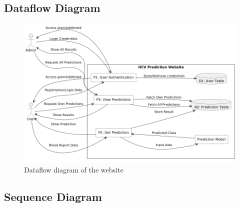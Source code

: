 \subsection{Dataflow Diagram}
\begin{figure}[htbp]
  \begin{center}
    \includegraphics[width=\textwidth]{figures/dataflow.png}
  \end{center}
  \caption{Dataflow diagram of the website}\label{fig:dataflow}
\end{figure}

\subsection{Sequence Diagram}


